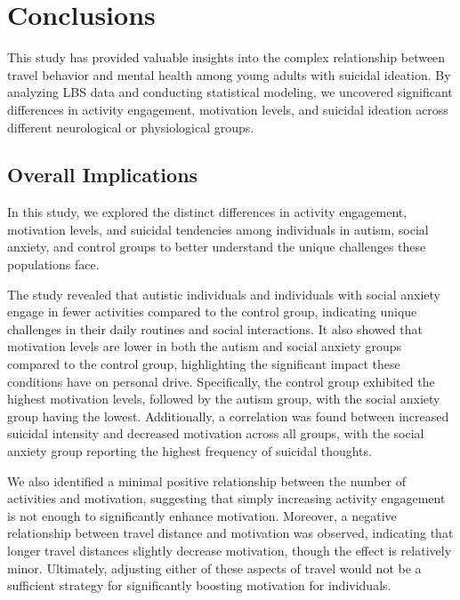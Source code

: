 \documentclass[
  letterpaper,
  number,
  review,
  3p]{elsarticle}
\begin{document}

\section{Conclusions}\label{sec-conclude}

This study has provided valuable insights into the complex relationship
between travel behavior and mental health among young adults with
suicidal ideation. By analyzing LBS data and conducting statistical
modeling, we uncovered significant differences in activity engagement,
motivation levels, and suicidal ideation across different neurological
or physiological groups.

\subsection{Overall Implications}\label{overall-implications}

In this study, we explored the distinct differences in activity
engagement, motivation levels, and suicidal tendencies among individuals
in autism, social anxiety, and control groups to better understand the
unique challenges these populations face.

The study revealed that autistic individuals and individuals with social
anxiety engage in fewer activities compared to the control group,
indicating unique challenges in their daily routines and social
interactions. It also showed that motivation levels are lower in both
the autism and social anxiety groups compared to the control group,
highlighting the significant impact these conditions have on personal
drive. Specifically, the control group exhibited the highest motivation
levels, followed by the autism group, with the social anxiety group
having the lowest. Additionally, a correlation was found between
increased suicidal intensity and decreased motivation across all groups,
with the social anxiety group reporting the highest frequency of
suicidal thoughts.

We also identified a minimal positive relationship between the number of
activities and motivation, suggesting that simply increasing activity
engagement is not enough to significantly enhance motivation. Moreover,
a negative relationship between travel distance and motivation was
observed, indicating that longer travel distances slightly decrease
motivation, though the effect is relatively minor. Ultimately, adjusting
either of these aspects of travel would not be a sufficient strategy for
significantly boosting motivation for individuals.
\end{document}
